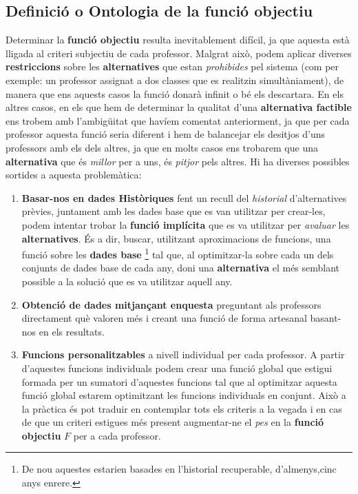 \documentclass[10pt,twocolumn]{article}
\begin{document}
\subsection{Definició o Ontologia de la funció objectiu}
Determinar la \textbf{funció objectiu} resulta inevitablement difícil, ja que aquesta està lligada al criteri subjectiu de cada professor. Malgrat això, podem aplicar diverses \textbf{restriccions} sobre les  \textbf{alternatives} que estan \textit{prohibides} pel sistema (com per exemple: un professor assignat a dos classes que es realitzin simultàniament), de manera que ens aquests casos la funció donarà infinit o bé els descartara. En els altres casos, en els que hem de determinar la qualitat d'una \textbf{alternativa factible} ens trobem amb l'ambigüitat que havíem comentat anteriorment, ja que per cada professor aquesta funció seria diferent i hem de balancejar els desitjos d'uns professors amb els dels altres, ja que en molts casos ens trobarem que una \textbf{alternativa} que és \textit{millor} per a uns, és \textit{pitjor} pels altres. Hi ha diverses possibles sortides a aquesta problemàtica:
\begin{enumerate}
	\item \textbf{Basar-nos en dades Històriques} fent un recull del \textit{historial}  d'alternatives prèvies, juntament amb les dades base que es van utilitzar per crear-les, podem intentar trobar la \textbf{funció implícita} que es va utilitzar per \textit{avaluar} les \textbf{alternatives}. És a dir, buscar, utilitzant aproximacions de funcions, una funció sobre les \textbf{dades base} \footnote{De nou aquestes estarien basades en l'historial recuperable, d'almenys,cinc anys enrere.} tal que, al optimitzar-la sobre cada un dels conjunts de dades base de cada any, doni una \textbf{alternativa} el més semblant possible a la solució que es va utilitzar aquell any. 
	\item \textbf{Obtenció de dades mitjançant enquesta} preguntant als professors directament què valoren més i creant una funció de forma artesanal basant-nos en els resultats.
	\item \textbf{Funcions personalitzables} a nivell individual per cada professor. A partir d'aquestes funcions individuals podem crear una funció global que estigui formada per un sumatori d'aquestes funcions tal que al optimitzar aquesta funció global estarem optimitzant les funcions individuals en conjunt. Això a la pràctica és pot traduir en contemplar tots els criteris a la vegada i en cas de que un criteri estigues més present augmentar-ne el \textit{pes} en la \textbf{funció objectiu} $F$ per a cada professor.
\end{enumerate} 
\end{document}
